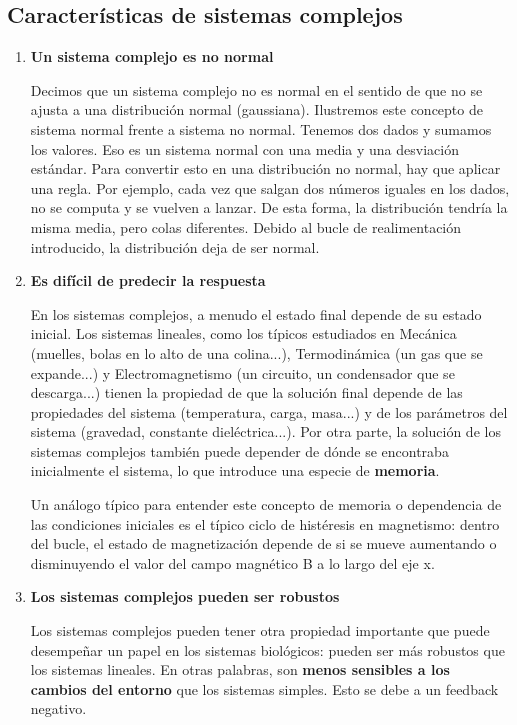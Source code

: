 \subsection{Características de sistemas complejos}
\begin{enumerate}
\item \textbf{Un sistema complejo es no normal}

Decimos que un sistema complejo no es normal en el sentido de que no se ajusta a una distribución normal (gaussiana). Ilustremos este concepto de sistema normal frente a sistema no normal. Tenemos dos dados y sumamos los valores. Eso es un sistema normal con una media y una desviación estándar. Para convertir esto en una distribución no normal, hay que aplicar una regla. Por ejemplo, cada vez que salgan dos números iguales en los dados, no se computa y se vuelven a lanzar. De esta forma, la distribución tendría la misma media, pero colas diferentes. Debido al bucle de realimentación introducido, la distribución deja de ser normal.

\item \textbf{Es difícil de predecir la respuesta}

En los sistemas complejos, a menudo el estado final depende de su estado inicial. Los sistemas lineales, como los típicos estudiados en Mecánica (muelles, bolas en lo alto de una colina...), Termodinámica (un gas que se expande...) y Electromagnetismo (un circuito, un condensador que se descarga...) tienen la propiedad de que la solución final depende de las propiedades del sistema (temperatura, carga, masa...) y de los parámetros del sistema (gravedad, constante dieléctrica...). Por otra parte, la solución de los sistemas complejos también puede depender de dónde se encontraba inicialmente el sistema, lo que introduce una especie de \textbf{memoria}.

Un análogo típico para entender este concepto de memoria o dependencia de las condiciones iniciales es el típico ciclo de histéresis en magnetismo: dentro del bucle, el estado de magnetización depende de si se mueve aumentando o disminuyendo el valor del campo magnético B a lo largo del eje x.

\item \textbf{Los sistemas complejos pueden ser robustos}

Los sistemas complejos pueden tener otra propiedad importante que puede desempeñar un papel en los sistemas biológicos: pueden ser más robustos que los sistemas lineales. En otras palabras, son \textbf{menos sensibles a los cambios del entorno} que los sistemas simples. Esto se debe a un feedback negativo.


\end{enumerate}
